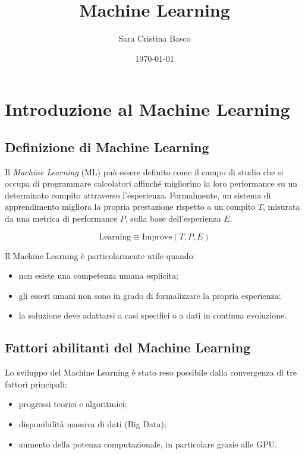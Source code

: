 \documentclass[a4paper,12pt]{report}
\title{\textbf{Machine Learning}}
\author{Sara Cristina Basco}
\date{\today}
\begin{document}
\maketitle

\tableofcontents
\clearpage

\chapter{Introduzione al Machine Learning}

\section{Definizione di Machine Learning}

Il \textit{Machine Learning} (ML) può essere definito come il campo di studio che si occupa di programmare calcolatori affinché migliorino la loro performance su un determinato compito attraverso l'esperienza.
Formalmente, un sistema di apprendimento migliora la propria prestazione rispetto a un compito $T$, misurata da una metrica di performance $P$, sulla base dell’esperienza $E$.

\[
\text{Learning} \equiv \text{Improve}(T, P, E)
\]

Il Machine Learning è particolarmente utile quando:
\begin{itemize}
    \item non esiste una competenza umana esplicita;
    \item gli esseri umani non sono in grado di formalizzare la propria esperienza;
    \item la soluzione deve adattarsi a casi specifici o a dati in continua evoluzione.
\end{itemize}

\section{Fattori abilitanti del Machine Learning}

Lo sviluppo del Machine Learning è stato reso possibile dalla convergenza di tre fattori principali:
\begin{itemize}
    \item progressi teorici e algoritmici;
    \item disponibilità massiva di dati (Big Data);
    \item aumento della potenza computazionale, in particolare grazie alle GPU.
\end{itemize}
\end{document}
